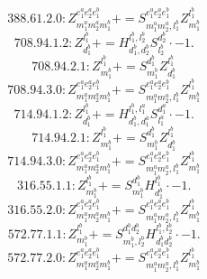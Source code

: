 \documentclass[letterpaper,10pt,fleqn,leqno,onecolumn]{article}
\begin{document}
\begin{equation} \;\;\;\;\;\;  388.61.2.0: Z^{e_{1}^{a}e_{2}^{a}e_{1}^{b}}_{m_{1}^{a}m_{2}^{a}m_{1}^{b}}+=S^{e_{1}^{a}e_{2}^{a}e_{1}^{b}}_{m_{1}^{a}m_{2}^{a},l_{1}^{b}}Z^{l_{1}^{b}}_{m_{1}^{b}} \end{equation}
\begin{equation} \;\;\;\;\;\;  708.94.1.2: Z^{l_{1}^{b}}_{d_{1}^{b}}+=H^{l_{1}^{b},l_{2}^{b}}_{d_{1}^{b},d_{2}^{b}}S^{d_{2}^{b}}_{l_{2}^{b}}\cdot -1. \end{equation}
\begin{equation} \;\;\;\;\;\;  708.94.2.1: Z^{l_{1}^{b}}_{m_{1}^{b}}+=S^{d_{1}^{b}}_{m_{1}^{b}}Z^{l_{1}^{b}}_{d_{1}^{b}} \end{equation}
\begin{equation} \;\;\;\;\;\;  708.94.3.0: Z^{e_{1}^{a}e_{2}^{a}e_{1}^{b}}_{m_{1}^{a}m_{2}^{a}m_{1}^{b}}+=S^{e_{1}^{a}e_{2}^{a}e_{1}^{b}}_{m_{1}^{a}m_{2}^{a},l_{1}^{b}}Z^{l_{1}^{b}}_{m_{1}^{b}} \end{equation}
\begin{equation} \;\;\;\;\;\;  714.94.1.2: Z^{l_{1}^{b}}_{d_{1}^{b}}+=H^{l_{1}^{b},l_{1}^{a}}_{d_{1}^{b},d_{1}^{a}}S^{d_{1}^{a}}_{l_{1}^{a}}\cdot -1. \end{equation}
\begin{equation} \;\;\;\;\;\;  714.94.2.1: Z^{l_{1}^{b}}_{m_{1}^{b}}+=S^{d_{1}^{b}}_{m_{1}^{b}}Z^{l_{1}^{b}}_{d_{1}^{b}} \end{equation}
\begin{equation} \;\;\;\;\;\;  714.94.3.0: Z^{e_{1}^{a}e_{2}^{a}e_{1}^{b}}_{m_{1}^{a}m_{2}^{a}m_{1}^{b}}+=S^{e_{1}^{a}e_{2}^{a}e_{1}^{b}}_{m_{1}^{a}m_{2}^{a},l_{1}^{b}}Z^{l_{1}^{b}}_{m_{1}^{b}} \end{equation}
\begin{equation} \;\;\;\;\;\;  316.55.1.1: Z^{l_{1}^{b}}_{m_{1}^{b}}+=S^{d_{1}^{b}}_{m_{1}^{b}}H^{l_{1}^{b}}_{d_{1}^{b}}\cdot -1. \end{equation}
\begin{equation} \;\;\;\;\;\;  316.55.2.0: Z^{e_{1}^{a}e_{2}^{a}e_{1}^{b}}_{m_{1}^{a}m_{2}^{a}m_{1}^{b}}+=S^{e_{1}^{a}e_{2}^{a}e_{1}^{b}}_{m_{1}^{a}m_{2}^{a},l_{1}^{b}}Z^{l_{1}^{b}}_{m_{1}^{b}} \end{equation}
\begin{equation} \;\;\;\;\;\;  572.77.1.1: Z^{l_{1}^{b}}_{m_{1}^{b}}+=S^{d_{1}^{b}d_{2}^{b}}_{m_{1}^{b},l_{2}^{b}}H^{l_{1}^{b},l_{2}^{b}}_{d_{1}^{b}d_{2}^{b}}\cdot -1. \end{equation}
\begin{equation} \;\;\;\;\;\;  572.77.2.0: Z^{e_{1}^{a}e_{2}^{a}e_{1}^{b}}_{m_{1}^{a}m_{2}^{a}m_{1}^{b}}+=S^{e_{1}^{a}e_{2}^{a}e_{1}^{b}}_{m_{1}^{a}m_{2}^{a},l_{1}^{b}}Z^{l_{1}^{b}}_{m_{1}^{b}} \end{equation}
\end{document}
